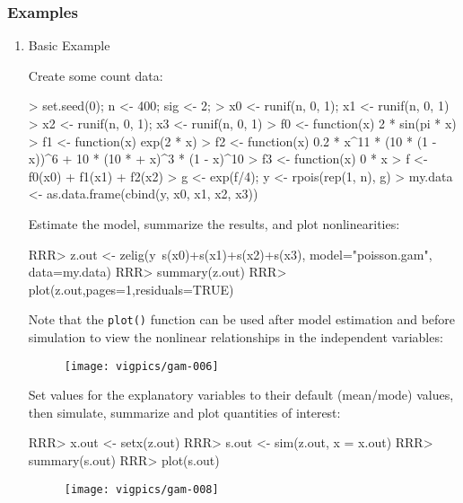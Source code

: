 \subsubsection{Examples}
\begin{enumerate}
\item Basic Example

Create some count data:

\begin{Schunk}
\begin{Sinput}
> set.seed(0);  n <- 400; sig <- 2; 
> x0 <- runif(n, 0, 1);  x1 <- runif(n, 0, 1)
> x2 <- runif(n, 0, 1);  x3 <- runif(n, 0, 1)
> f0 <- function(x) 2 * sin(pi * x)
> f1 <- function(x) exp(2 * x)
> f2 <- function(x) 0.2 * x^11 * (10 * (1 - x))^6 + 10 * (10 * 
+     x)^3 * (1 - x)^10
> f3 <- function(x) 0 * x
> f <- f0(x0) + f1(x1) + f2(x2)
> g <- exp(f/4);  y <- rpois(rep(1, n), g)
> my.data <- as.data.frame(cbind(y, x0, x1, x2, x3))
\end{Sinput}
\end{Schunk}

Estimate the model, summarize the results, and plot nonlinearities:

\begin{Schunk}
\begin{Sinput}
RRR> z.out <- zelig(y~s(x0)+s(x1)+s(x2)+s(x3), model="poisson.gam", data=my.data)
RRR> summary(z.out)
RRR> plot(z.out,pages=1,residuals=TRUE)
\end{Sinput}
\end{Schunk}
Note that the {\tt plot()} function can be used after model estimation and before simulation to view the nonlinear relationships in the independent variables: 

\begin{figure}[here]
\centering
\texttt{[image: vigpics/gam-006]}
\label{fig:plotgam}
\end{figure}

Set values for the explanatory variables to their default (mean/mode) values, then simulate, summarize and plot quantities of interest:
\begin{Schunk}
\begin{Sinput}
RRR>  x.out <- setx(z.out)
RRR>  s.out <- sim(z.out, x = x.out) 
RRR>  summary(s.out) 
RRR>  plot(s.out) 
\end{Sinput}
\end{Schunk}

\begin{figure}[here]
\centering
\texttt{[image: vigpics/gam-008]}
\label{fig:plotgam}
\end{figure}


\end{enumerate}
